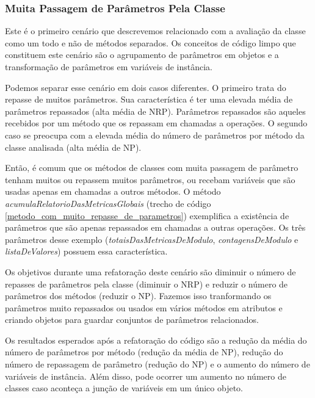 \subsubsection{Muita Passagem de Parâmetros Pela Classe}
	
Este é o primeiro cenário que descrevemos relacionado com a avaliação da classe como um todo e não de métodos separados. Os conceitos de código limpo que constituem este cenário são o agrupamento de parâmetros em objetos e a transformação de parâmetros em variáveis de instância.
	
Podemos separar esse cenário em dois casos diferentes. O primeiro trata do repasse de muitos parâmetros. Sua característica é ter uma elevada média de parâmetros repassados (alta média de NRP). Parâmetros repassados são aqueles recebidos por um método que os repassam em chamadas a operações. O segundo caso se preocupa com a elevada média do número de parâmetros por método da classe analisada (alta média de NP).       
		     
Então, é comum que os métodos de classes com muita passagem de parâmetro tenham muitos ou repassem muitos parâmetros, ou recebam variáveis que são usadas apenas em chamadas a outros métodos.	O método \textit{acumulaRelatorioDasMetricasGlobais} (trecho de código \ref{metodo_com_muito_repasse_de_parametros}) exemplifica a existência de parâmetros que são apenas repassados em chamadas a outras operações. Os três parâmetros desse exemplo (\textit{totaisDasMetricasDeModulo}, \textit{contagensDeModulo} e \textit{listaDeValores}) possuem essa característica. 
	                                                               
                                     
	
Os objetivos durante uma refatoração deste cenário são diminuir o número de repasses de parâmetros pela classe (diminuir o NRP) e reduzir o número de parâmetros dos métodos (reduzir o NP). Fazemos isso tranformando os parâmetros muito repassados ou usados em vários métodos em atributos e criando objetos para guardar conjuntos de parâmetros relacionados.
	
Os resultados esperados após a refatoração do código são a redução da média do número de parâmetros por método (redução da média de NP), redução do número de repassagem de parâmetro (redução do NP) e o aumento do número de variáveis de instância. Além disso, pode ocorrer um aumento no número de classes caso aconteça a junção de variáveis em um único objeto.	           


